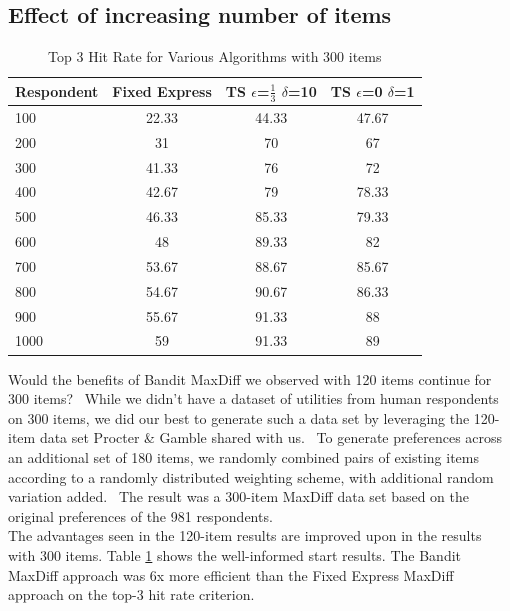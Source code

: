 \documentclass[nonblindrev]{informs3}
\begin{document}
\subsection{Effect of increasing number of items}
\begin{table}
\begin{center}
\begin{tabular}{l | c | c | c}
 Respondent& Fixed Express &  TS $\epsilon$=$\frac{1}{3}$ $\delta$=10  &TS $\epsilon$=0 $\delta$=1 \\
\hline
100	&	22.33	&	44.33	&	47.67	\\
200	&	31	&	70	&	67	\\	
300	&	41.33	&	76	&	72	\\	
400	&	42.67	&	79	&	78.33	\\	
500	&	46.33	&	85.33	&	79.33	\\
600	&	48	&	89.33	&	82	\\	
700	&	53.67	&	88.67	&	85.67	\\
800	&	54.67	&	90.67	&	86.33	\\
900	&	55.67	&	91.33	&	88	\\
1000	&	59	&	91.33	&	89	\\	
\hline
\end{tabular}
\end{center}
\caption{Top 3 Hit Rate for Various Algorithms with 300 items}
\label{table:300top3}
\end{table}
Would the benefits of Bandit MaxDiff we observed with 120 items continue for 300 items?  While we didn't have a dataset of utilities from human respondents on 300 items, we did our best to generate such a data set by leveraging the 120-item data set Procter \& Gamble shared with us.  To generate preferences across an additional set of 180 items, we randomly combined pairs of existing items according to a randomly distributed weighting scheme, with additional random variation added.  The result was a 300-item MaxDiff data set based on the original preferences of the 981 respondents.\\
The advantages seen in the 120-item results are improved upon in the results with 300 items. Table \ref{table:300top3} shows the well-informed start results. The Bandit MaxDiff approach was 6x more efficient than the Fixed Express MaxDiff approach on the top-3 hit rate criterion.\\
\end{document}
